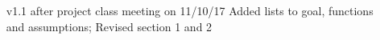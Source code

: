\begin{itemize}

\item[v1.1] after project class meeting on 11/10/17
Added lists to goal, functions and assumptions;
Revised section 1 and 2 



\end{itemize}